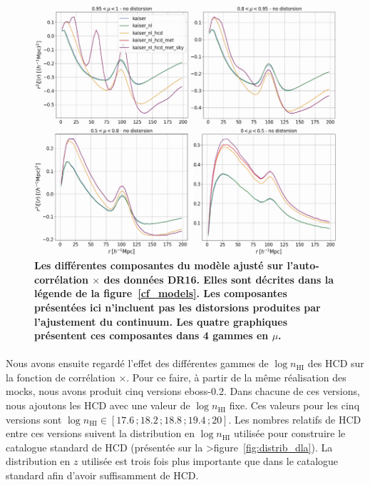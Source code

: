 \documentclass[11pt, twoside, a4paper, openright]{report}
\begin{document}
\begin{figure}
  \centering
  \includegraphics[scale=0.5]{cf_models_no_dist}
  \caption{\textbf{Les différentes composantes du modèle ajusté sur l'auto-corrélation \lya{}$\times$\lya{} des données DR16. Elles sont décrites dans la légende de la figure~\ref{cf_models}.
    Les composantes présentées ici n'incluent pas les distorsions produites par l'ajustement du continuum.
    Les quatre graphiques présentent ces composantes dans 4 gammes en $\mu$.}}
  \label{fig:cf_models_no_dist}
\end{figure}


\paragraph{}
Nous avons ensuite regardé l'effet des différentes gammes de $\log n_{\mathrm{HI}}$ des HCD sur la fonction de corrélation \lya{}$\times$\lya{}.
Pour ce faire, à partir de la même réalisation des mocks, nous avons produit cinq versions eboss-0.2. Dans chacune de ces versions, nous ajoutons les HCD avec une valeur de $\log n_{\mathrm{HI}}$ fixe. Ces valeurs pour les cinq versions sont $\log n_{\mathrm{HI}} \in [\num{17.6}\,;\num{18.2}\,;\num{18.8}\,;\num{19.4}\,;\num{20}]$. Les nombres relatifs de HCD entre ces versions suivent la distribution en $\log n_{\mathrm{HI}}$ utilisée pour construire le catalogue standard de HCD (présentée sur la >figure~\ref{fig:distrib_dla}). La distribution en $z$ utilisée est trois fois plus importante que dans le catalogue standard afin d'avoir suffisamment de HCD.
\end{document}
